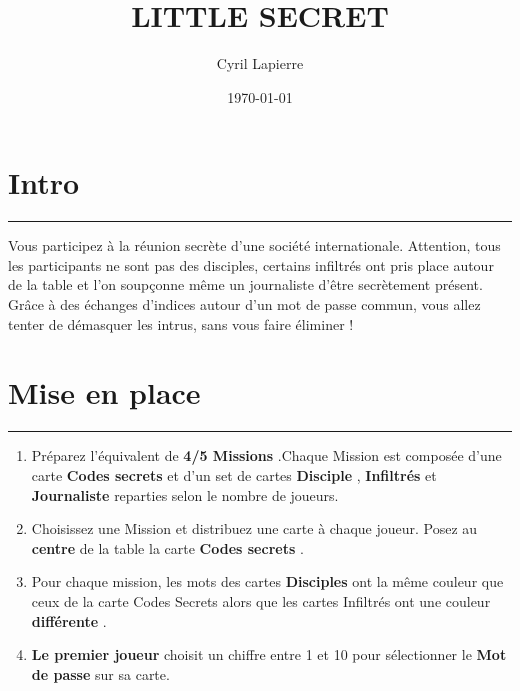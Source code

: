 \documentclass{article}%
\title{LITTLE SECRET}%
\author{Cyril Lapierre}%
\date{\today}%
\begin{document}
%
\normalsize%
\maketitle\thispagestyle{header}%
\pagestyle{header}%
\sectionfont{\color{blue}}%
\subsectionfont{\color{blue}}%
\subsubsectionfont{\color{blue}}%
\section{ Intro
}%
\label{sec:Intro}%
\textcolor{blue}{\rule{18cm}{0.07cm}}\break%
Vous participez à la réunion secrète d'une société internationale. Attention, tous les participants ne sont pas des disciples, certains infiltrés ont pris place autour de la table et l'on soupçonne même un journaliste d'être secrètement présent. Grâce à des échanges d'indices autour d'un mot de passe commun, vous allez tenter de démasquer les intrus, sans vous faire éliminer !


%
\sectionfont{\color{mygreen}}%
\subsectionfont{\color{mygreen}}%
\subsubsectionfont{\color{mygreen}}%
\section{ Mise en place
}%
\label{sec:Miseenplace}%
\textcolor{mygreen}{\rule{18cm}{0.07cm}}\break%
\begin{enumerate}%
\item%
%
 Préparez l'équivalent de %
\textcolor{mygreen}{%
\textbf{4/5 Missions}%
}%
.Chaque Mission est composée d'une carte %
\textcolor{mygreen}{%
\textbf{Codes secrets}%
}%
\textit{ }%
 et d'un set de cartes %
\textcolor{mygreen}{%
\textbf{Disciple}%
}%
,%
\textcolor{mygreen}{%
\textbf{ Infiltrés}%
}%
\textit{ }%
 et %
\textcolor{mygreen}{%
\textbf{Journaliste}%
}%
\textit{ }%
 reparties selon le nombre de joueurs.
%
\item%
%
 Choisissez une Mission et distribuez une carte à chaque joueur. Posez au %
\textcolor{mygreen}{%
\textbf{centre}%
}%
\textit{ }%
 de la table la carte %
\textcolor{mygreen}{%
\textbf{Codes secrets}%
}%
.
%
\item%
%
 Pour chaque mission, les mots des cartes %
\textcolor{mygreen}{%
\textbf{Disciples}%
}%
\textit{ }%
 ont la même couleur que ceux de la carte Codes Secrets alors que les cartes Infiltrés ont une couleur %
\textcolor{mygreen}{%
\textbf{différente}%
}%
.
%
\item%
%
\textcolor{mygreen}{%
\textbf{Le premier joueur}%
}%
\textit{ }%
 choisit un chiffre entre 1 et 10 pour sélectionner le %
\textcolor{mygreen}{%
\textbf{Mot de passe}%
}%
\textit{ }%
 sur sa carte.
%
\end{enumerate}
\end{document}
